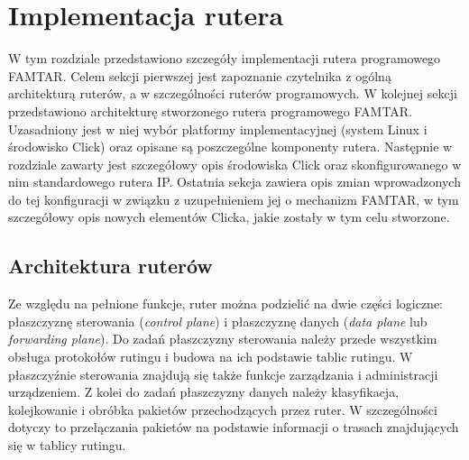 \chapter{Implementacja rutera}
\label{chapter-4}

W tym rozdziale przedstawiono szczegóły implementacji rutera programowego FAMTAR. Celem sekcji pierwszej jest zapoznanie czytelnika z ogólną architekturą ruterów, a w szczególności ruterów programowych. W kolejnej sekcji przedstawiono architekturę stworzonego rutera programowego FAMTAR. Uzasadniony jest w niej wybór platformy implementacyjnej (system Linux i środowisko Click) oraz opisane są poszczególne komponenty rutera. Następnie w rozdziale zawarty jest szczegółowy opis środowiska Click oraz skonfigurowanego w nim standardowego rutera IP. Ostatnia sekcja zawiera opis zmian wprowadzonych do tej konfiguracji w związku z uzupełnieniem jej o mechanizm FAMTAR, w tym szczegółowy opis nowych elementów Clicka, jakie zostały w tym celu stworzone.

\vspace{0.5cm}

\section{Architektura ruterów}

Ze względu na pełnione funkcje, ruter można podzielić na dwie części logiczne: płaszczyznę sterowania (\emph{control plane}) i płaszczyznę danych (\emph{data plane} lub \emph{forwarding plane}). Do zadań płaszczyzny sterowania należy przede wszystkim obsługa protokołów rutingu i budowa na ich podstawie tablic rutingu. W płaszczyźnie sterowania znajdują się także funkcje zarządzania i administracji urządzeniem. Z kolei do zadań płaszczyzny danych należy klasyfikacja, kolejkowanie i obróbka pakietów przechodzących przez ruter. W szczególności dotyczy to przełączania pakietów na podstawie informacji o trasach znajdujących się w tablicy rutingu.
